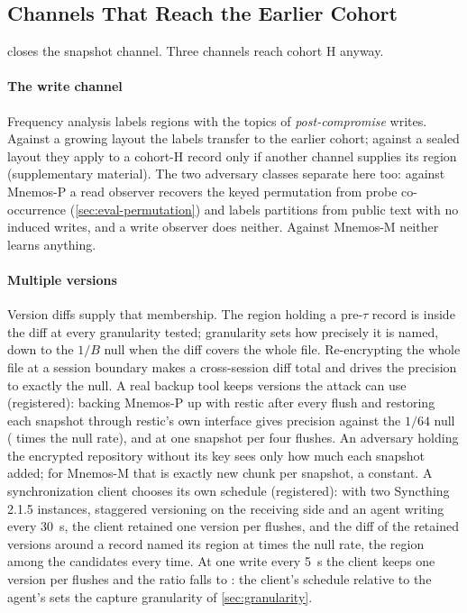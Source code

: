 \subsection{Channels That Reach the Earlier Cohort}
\label{sec:eval-cohorth}
\label{sec:eval-write}
\label{sec:eval-multisnapshot}
\label{sec:eval-refusal}

 closes the snapshot channel. Three channels reach cohort H anyway.

\paragraph{The write channel}
Frequency analysis labels regions with the topics of \emph{post-compromise} writes. Against a
growing layout the labels transfer to the earlier cohort; against a sealed layout they apply to a
cohort-H record only if another channel supplies its region (supplementary material). The two adversary
classes separate here too: against Mnemos-P a read observer recovers the keyed permutation from
probe co-occurrence (\cref{sec:eval-permutation}) and labels partitions from public text with no
induced writes, and a write observer does neither. Against Mnemos-M neither learns anything.

\paragraph{Multiple versions}
Version diffs supply that membership. The region holding a pre-$\tau$ record is inside the diff at
every granularity tested; granularity sets how precisely it is named, down to the $1/B$ null when the
diff covers the whole file. Re-encrypting the whole file at a session boundary makes a
cross-session diff total and drives the precision to exactly the null. A real backup tool keeps
versions the attack can use (registered): backing Mnemos-P up with restic after every
flush and restoring each snapshot through restic's own interface gives precision
\REnineteenPrecPOne{} against the $1/64$ null (\REnineteenPrecRatio{} times the null rate), and \REnineteenPrecPFour{} at one snapshot per four
flushes. An adversary holding the encrypted repository without its key sees only how much each
snapshot added; for Mnemos-M that is exactly \REnineteenMBlobs{} new chunk per snapshot, a constant.
A synchronization client chooses its own schedule (registered): with two Syncthing 2.1.5 instances,
staggered versioning on the receiving side and an agent writing every 30~s, the client retained one
version per \REthirtythreeAgentFlushes{} flushes, and the diff of the retained versions around a
record named its region at \REthirtythreeAgentRatio{} times the null rate, the region among the
candidates every time. At one write every 5~s the client keeps one version per
\REthirtythreeFastFlushes{} flushes and the ratio falls to \REthirtythreeFastRatio: the client's
schedule relative to the agent's sets the capture granularity of \cref{sec:granularity}.

